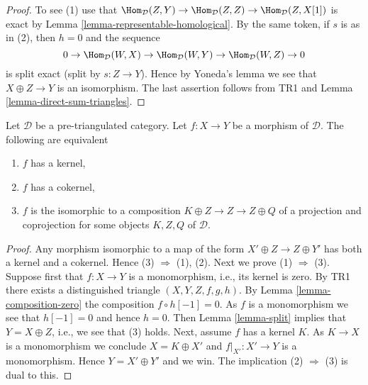 \begin{proof}
To see (1) use that
$\Hom_\mathcal{D}(Z, Y) \to \Hom_\mathcal{D}(Z, Z) \to
\Hom_\mathcal{D}(Z, X[1])$
is exact by
Lemma \ref{lemma-representable-homological}.
By the same token, if $s$ is as in (2), then $h = 0$ and the sequence
$$
0 \to \Hom_\mathcal{D}(W, X) \to \Hom_\mathcal{D}(W, Y)
\to \Hom_\mathcal{D}(W, Z) \to 0
$$
is split exact (split by $s : Z \to Y$). Hence by Yoneda's lemma we
see that $X \oplus Z \to Y$ is an isomorphism. The last assertion follows
from TR1 and
Lemma \ref{lemma-direct-sum-triangles}.
\end{proof}

\begin{lemma}
\label{lemma-when-split}
Let $\mathcal{D}$ be a pre-triangulated category.
Let $f : X \to Y$ be a morphism of $\mathcal{D}$.
The following are equivalent
\begin{enumerate}
\item $f$ has a kernel,
\item $f$ has a cokernel,
\item $f$ is the isomorphic to a composition
$K \oplus Z \to Z \to Z \oplus Q$ of a projection and coprojection
for some objects $K, Z, Q$ of $\mathcal{D}$.
\end{enumerate}
\end{lemma}

\begin{proof}
Any morphism isomorphic to a map of the form
$X' \oplus Z \to Z \oplus Y'$ has both a kernel and a cokernel.
Hence (3) $\Rightarrow$ (1), (2).
Next we prove (1) $\Rightarrow$ (3).
Suppose first that $f : X \to Y$ is a monomorphism, i.e., its kernel is zero.
By TR1 there exists a distinguished triangle $(X, Y, Z, f, g, h)$.
By Lemma \ref{lemma-composition-zero} the composition
$f \circ h[-1] = 0$. As $f$ is a monomorphism we see that $h[-1] = 0$
and hence $h = 0$. Then
Lemma \ref{lemma-split}
implies that $Y = X \oplus Z$, i.e., we see that (3) holds.
Next, assume $f$ has a kernel $K$. As $K \to X$ is a monomorphism we
conclude $X = K \oplus X'$ and $f|_{X'} : X' \to Y$ is a monomorphism.
Hence $Y = X' \oplus Y'$ and we win.
The implication (2) $\Rightarrow$ (3) is dual to this.
\end{proof}

